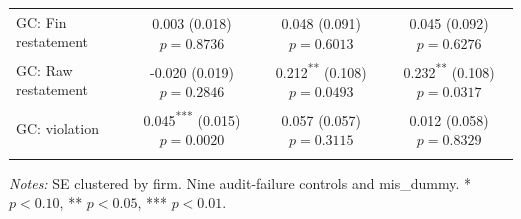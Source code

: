 \documentclass[10pt]{article}
\newcommand{\sym}[1]{\textsuperscript{#1}}
\begin{document}
\begin{tabular*}{\textwidth}{@{\extracolsep{\fill}}lccc@{}}
GC: Fin restatement & \shortstack{0.003\sym{}\\(0.018)\\$p=0.8736$} & \shortstack{0.048\sym{}\\(0.091)\\$p=0.6013$} & \shortstack{0.045\sym{}\\(0.092)\\$p=0.6276$} \\ \addlinespace
GC: Raw restatement & \shortstack{-0.020\sym{}\\(0.019)\\$p=0.2846$} & \shortstack{0.212\sym{**}\\(0.108)\\$p=0.0493$} & \shortstack{0.232\sym{**}\\(0.108)\\$p=0.0317$} \\ \addlinespace
GC: violation & \shortstack{0.045\sym{***}\\(0.015)\\$p=0.0020$} & \shortstack{0.057\sym{}\\(0.057)\\$p=0.3115$} & \shortstack{0.012\sym{}\\(0.058)\\$p=0.8329$} \\ \addlinespace
\bottomrule
\end{tabular*}
\par\medskip\fontsize{9}{11}\selectfont\textit{Notes:} SE clustered by firm. Nine audit-failure controls and mis\_dummy. * $p<0.10$, ** $p<0.05$, *** $p<0.01$.
\end{document}
